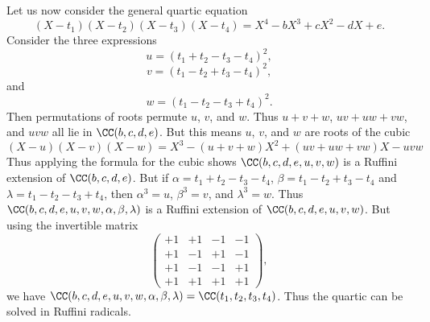 \begin{example}
	Let us now consider the general quartic equation
	\[ (X - t_1)(X - t_2)(X - t_3)(X - t_4) = X^4 - b X^3 + c X^2 - d X + e. \]
	Consider the three expressions
	\[ u = (t_1 + t_2 - t_3 - t_4)^2, \]
	\[ v = (t_1 - t_2 + t_3 - t_4)^2, \]
	and
	\[ w = (t_1 - t_2 - t_3 + t_4)^2. \]
	Then permutations of roots permute $u$, $v$, and $w$. Thus $u + v + w$, $uv + uw + vw$, and $uvw$ all lie in $\CC(b,c,d,e)$. But this means $u$, $v$, and $w$ are roots of the cubic
	\[ (X - u)(X - v)(X - w) = X^3 - (u + v + w) X^2 + (uv + uw + vw) X - uvw \]
	Thus applying the formula for the cubic shows $\CC(b,c,d,e,u,v,w)$ is a Ruffini extension of $\CC(b,c,d,e)$. But if $\alpha = t_1 + t_2 - t_3 - t_4$, $\beta = t_1 - t_2 + t_3 - t_4$ and $\lambda = t_1 - t_2 - t_3 + t_4$, then $\alpha^3 = u$, $\beta^3 = v$, and $\lambda^3 = w$. Thus $\CC(b,c,d,e,u,v,w,\alpha,\beta,\lambda)$ is a Ruffini extension of $\CC(b,c,d,e,u,v,w)$. But using the invertible matrix
	\[ \begin{pmatrix} +1 & +1 & -1 & -1 \\ +1 & -1 & +1 & -1 \\ +1 & -1 & -1 & +1 \\ +1 & +1 & +1 & +1 \end{pmatrix}, \]
	we have $\CC(b,c,d,e,u,v,w,\alpha,\beta,\lambda) = \CC(t_1,t_2,t_3,t_4)$. Thus the quartic can be solved in Ruffini radicals.
\end{example}

%
%
%
%

